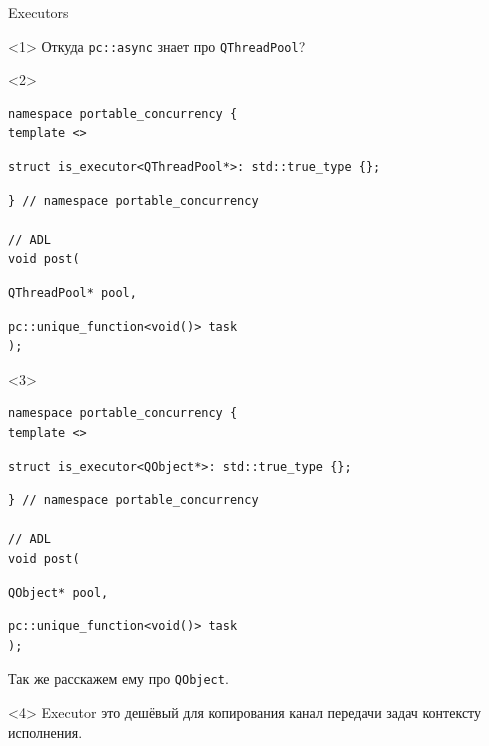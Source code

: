 \documentclass[aspectratio=169,pdf,hyperref={unicode},17pt]{beamer}
\begin{document}
\begin{frame}[fragile,t]{Executors}
\begin{onlyenv}<1>
Откуда \texttt{pc::async} знает про \texttt{QThreadPool}?
\end{onlyenv}
\begin{onlyenv}<2>
\begin{lstlisting}[style=cppcode,aboveskip=0pt,belowskip=0pt]
namespace portable_concurrency {
template <>
\end{lstlisting}
\begin{lstlisting}[style=cppcode,backgroundcolor=\color{gray!30},aboveskip=0pt,belowskip=0pt]
struct is_executor<QThreadPool*>: std::true_type {};
\end{lstlisting}
\begin{lstlisting}[style=cppcode,aboveskip=0pt,belowskip=0pt]
} // namespace portable_concurrency

// ADL
void post(
\end{lstlisting}
\begin{lstlisting}[style=cppcode,backgroundcolor=\color{gray!30},aboveskip=0pt,belowskip=0pt]
  QThreadPool* pool,
\end{lstlisting}
\begin{lstlisting}[style=cppcode,aboveskip=0pt,belowskip=0pt]
  pc::unique_function<void()> task
);
\end{lstlisting}
\end{onlyenv}
\begin{onlyenv}<3>
\begin{lstlisting}[style=cppcode,aboveskip=0pt,belowskip=0pt]
namespace portable_concurrency {
template <>
\end{lstlisting}
\begin{lstlisting}[style=cppcode,backgroundcolor=\color{gray!30},aboveskip=0pt,belowskip=0pt]
struct is_executor<QObject*>: std::true_type {};
\end{lstlisting}
\begin{lstlisting}[style=cppcode,aboveskip=0pt,belowskip=0pt]
} // namespace portable_concurrency

// ADL
void post(
\end{lstlisting}
\begin{lstlisting}[style=cppcode,backgroundcolor=\color{gray!30},aboveskip=0pt,belowskip=0pt]
  QObject* pool,
\end{lstlisting}
\begin{lstlisting}[style=cppcode,aboveskip=0pt,belowskip=0pt]
  pc::unique_function<void()> task
);
\end{lstlisting}
Так же расскажем ему про \texttt{QObject}.
\end{onlyenv}
\begin{onlyenv}<4>
Executor это дешёвый для копирования канал передачи задач контексту исполнения.


\end{onlyenv}
\end{frame}
\end{document}

